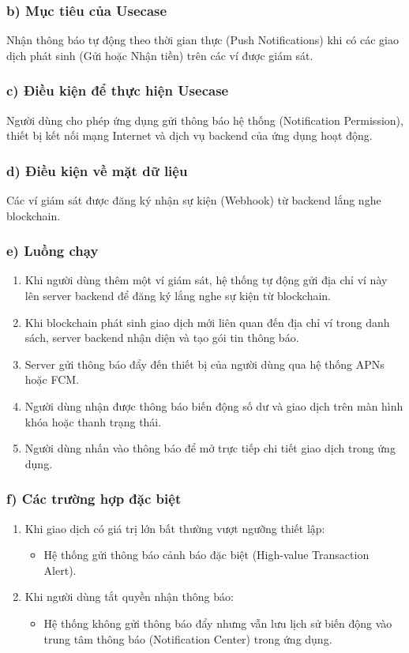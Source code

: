\documentclass[a4paper]{report}
\begin{document}
\subsubsection{b) Mục tiêu của Usecase}
Nhận thông báo tự động theo thời gian thực (Push Notifications) khi có các giao dịch phát sinh (Gửi hoặc Nhận tiền) trên các ví được giám sát.

\subsubsection{c) Điều kiện để thực hiện Usecase}
Người dùng cho phép ứng dụng gửi thông báo hệ thống (Notification Permission), thiết bị kết nối mạng Internet và dịch vụ backend của ứng dụng hoạt động.

\subsubsection{d) Điều kiện về mặt dữ liệu}
Các ví giám sát được đăng ký nhận sự kiện (Webhook) từ backend lắng nghe blockchain.

\subsubsection{e) Luồng chạy}
\begin{enumerate}
    \item Khi người dùng thêm một ví giám sát, hệ thống tự động gửi địa chỉ ví này lên server backend để đăng ký lắng nghe sự kiện từ blockchain.
    \item Khi blockchain phát sinh giao dịch mới liên quan đến địa chỉ ví trong danh sách, server backend nhận diện và tạo gói tin thông báo.
    \item Server gửi thông báo đẩy đến thiết bị của người dùng qua hệ thống APNs hoặc FCM.
    \item Người dùng nhận được thông báo biến động số dư và giao dịch trên màn hình khóa hoặc thanh trạng thái.
    \item Người dùng nhấn vào thông báo để mở trực tiếp chi tiết giao dịch trong ứng dụng.
\end{enumerate}

\subsubsection{f) Các trường hợp đặc biệt}
\begin{enumerate}
    \item Khi giao dịch có giá trị lớn bất thường vượt ngưỡng thiết lập:
    \begin{itemize}
        \item Hệ thống gửi thông báo cảnh báo đặc biệt (High-value Transaction Alert).
    \end{itemize}
    \item Khi người dùng tắt quyền nhận thông báo:
    \begin{itemize}
        \item Hệ thống không gửi thông báo đẩy nhưng vẫn lưu lịch sử biến động vào trung tâm thông báo (Notification Center) trong ứng dụng.
    \end{itemize}
\end{enumerate}
\end{document}
